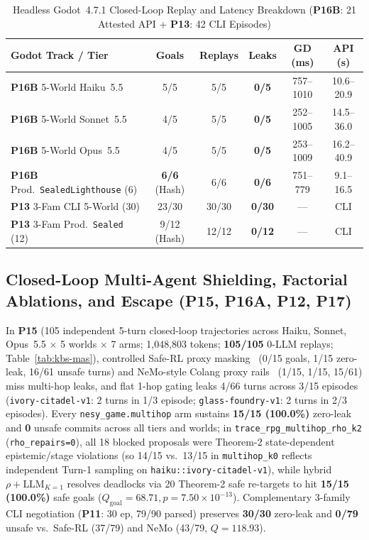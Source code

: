 \begin{table}[!tbp]
\caption{Headless Godot~4.7.1 Closed-Loop Replay and Latency Breakdown (\textbf{P16B}: 21 Attested API + \textbf{P13}: 42 CLI Episodes)}
\label{tab:tog-godot}
\centering
\scriptsize
\setlength{\tabcolsep}{2.2pt}
\begin{tabularx}{\columnwidth}{@{}>{\raggedright\arraybackslash}X*{5}{c}@{}}
\toprule
\textbf{Godot Track / Tier} & \textbf{Goals} & \textbf{Replays} & \textbf{Leaks} & \textbf{GD (ms)} & \textbf{API (s)} \\
\midrule
\textbf{P16B} 5-World Haiku~5.5 & 5/5 & 5/5 & \textbf{0/5} & 757--1010 & 10.6--20.9 \\
\textbf{P16B} 5-World Sonnet~5.5 & 4/5 & 5/5 & \textbf{0/5} & 252--1005 & 14.5--36.0 \\
\textbf{P16B} 5-World Opus~5.5 & 4/5 & 5/5 & \textbf{0/5} & 253--1009 & 16.2--40.9 \\
\textbf{P16B} Prod.\ \texttt{SealedLighthouse} (6) & \textbf{6/6} (Hash) & 6/6 & \textbf{0/6} & 751--779 & 9.1--16.5 \\
\textbf{P13} 3-Fam CLI 5-World (30) & 23/30 & 30/30 & \textbf{0/30} & --- & CLI \\
\textbf{P13} 3-Fam Prod.\ \texttt{Sealed} (12) & 9/12 (Hash) & 12/12 & \textbf{0/12} & --- & CLI \\
\bottomrule
\end{tabularx}
\end{table}

\subsection{Closed-Loop Multi-Agent Shielding, Factorial Ablations, and Escape (\textbf{P15}, \textbf{P16A}, \textbf{P12}, \textbf{P17})}
In \textbf{P15} (105 independent 5-turn closed-loop trajectories across Haiku, Sonnet, Opus~5.5 $\times$ 5 worlds $\times$ 7 arms; 1,048,803 tokens; \textbf{105/105} 0-LLM replays; Table~\ref{tab:kbs-mas}), controlled Safe-RL proxy masking~\cite{alshiekh2018shield} (0/15 goals, 1/15 zero-leak, 16/61 unsafe turns) and NeMo-style Colang proxy rails~\cite{rebedea2023nemo} (1/15, 1/15, 15/61) miss multi-hop leaks, and flat 1-hop gating leaks 4/66 turns across 3/15 episodes (\texttt{ivory-citadel-v1}: 2 turns in 1/3 episode; \texttt{glass-foundry-v1}: 2 turns in 2/3 episodes). Every \texttt{nesy\_game.multihop} arm sustains \textbf{15/15 (100.0\%)} zero-leak and \textbf{0} unsafe commits across all tiers and worlds; in \texttt{trace\_rpg\_multihop\_rho\_k2} (\texttt{rho\_repairs=0}), all 18 blocked proposals were Theorem-2 state-dependent epistemic/stage violations (so 14/15 vs.\ 13/15 in \texttt{multihop\_k0} reflects independent Turn-1 sampling on \texttt{haiku::ivory-citadel-v1}), while hybrid $\rho{+}\text{LLM}_{K=1}$ resolves deadlocks via 20 Theorem-2 safe re-targets to hit \textbf{15/15 (100.0\%)} safe goals ($Q_{\mathrm{goal}}{=}68.71, p{=}7.50{\times}10^{-13}$). Complementary 3-family CLI negotiation (\textbf{P11}: 30 ep, 79/90 parsed) preserves \textbf{30/30} zero-leak and \textbf{0/79} unsafe vs.\ Safe-RL (37/79) and NeMo (43/79, $Q{=}118.93$).

